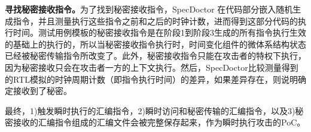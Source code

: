 \textbf{寻找秘密接收指令。}为了找到秘密接收指令，SpecDoctor 在代码部分嵌入随机生成指令，并且测量执行这些指令之前和之后的时钟计数，进而得到这部分代码的执行时间。测试用例模板的秘密接收指令是在阶段1到阶段3生成的所有指令执行生效的基础上的执行的，所以当秘密接收指令执行时，时间变化组件的微体系结构状态已经被秘密传输指令所改变了。此外，秘密接收指令只能在攻击者的特权下执行，因为秘密接收只会在攻击者一方的上下文执行。然后，SpecDoctor比较测量得到的RTL模拟的时钟周期计数（即指令执行时间）的差异，如果差异存在，则说明确定接收到了秘密。\par

最终，1)触发瞬时执行的汇编指令，2)瞬时访问和秘密传输的汇编指令，以及3)秘密接收的汇编指令组成的汇编文件会被完整保存起来，作为瞬时执行攻击的PoC。





